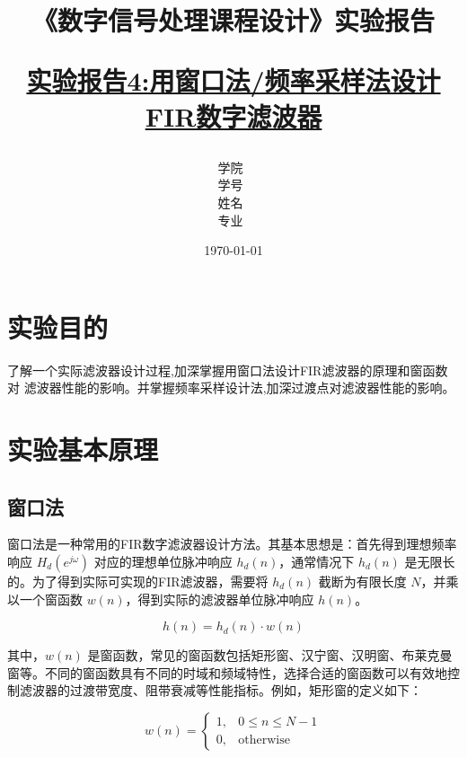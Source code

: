 \documentclass[12pt,hyperref,a4paper,UTF8]{ctexart}
\title{ 
        \vspace{1cm}
        \heiti \Huge \textbf{《数字信号处理课程设计》实验报告} \par
        \vspace{1cm} 
        \heiti \Large {\underline{实验报告4:用窗口法/频率采样法设计FIR数字滤波器}   } 
        \vspace{3cm}
    
    }
\author{
        \vspace{0.5cm}
        \kaishu\Large 学院\ \dlmu[9cm]{卓越学院} \\ %
        \vspace{0.5cm}
        \kaishu\Large 学号\ \dlmu[9cm]{23040447} \\ %
        \vspace{0.5cm}
        \kaishu\Large 姓名\ \dlmu[9cm]{陈文轩} \qquad  \\ %
        \vspace{0.5cm}
        \kaishu\Large 专业\ \dlmu[9cm]{智能硬件与系统(电子信息工程)} \qquad \\ %
    }
\date{\today} %
\begin{document}
\cover
\thispagestyle{empty} %







\newpage
\setcounter{page}{1} %

\section{实验目的}

了解一个实际滤波器设计过程,加深掌握用窗口法设计FIR滤波器的原理和窗函数对
滤波器性能的影响。并掌握频率采样设计法,加深过渡点对滤波器性能的影响。

\section{实验基本原理}

\subsection{窗口法}

窗口法是一种常用的FIR数字滤波器设计方法。其基本思想是：首先得到理想频率响应 $H_d(e^{j\omega})$ 对应的理想单位脉冲响应 $h_d(n)$，通常情况下 $h_d(n)$ 是无限长的。为了得到实际可实现的FIR滤波器，需要将 $h_d(n)$ 截断为有限长度 $N$，并乘以一个窗函数 $w(n)$，得到实际的滤波器单位脉冲响应 $h(n)$。

$$h(n) = h_d(n) \cdot w(n)$$

其中，$w(n)$ 是窗函数，常见的窗函数包括矩形窗、汉宁窗、汉明窗、布莱克曼窗等。不同的窗函数具有不同的时域和频域特性，选择合适的窗函数可以有效地控制滤波器的过渡带宽度、阻带衰减等性能指标。例如，矩形窗的定义如下：

$$ w(n) = \begin{cases} 
1, & 0 \leq n \leq N-1 \\
0, & \text{otherwise}
\end{cases} $$
\end{document}
